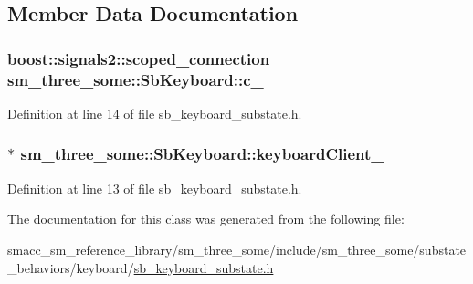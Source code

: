 \subsection{Member Data Documentation}
\subsubsection[{\texorpdfstring{c\+\_\+}{c_}}]{\setlength{\rightskip}{0pt plus 5cm}boost\+::signals2\+::scoped\+\_\+connection sm\+\_\+three\+\_\+some\+::\+Sb\+Keyboard\+::c\+\_\+}\hypertarget{classsm__three__some_1_1SbKeyboard_a3b384b219aad93ff23a9bcdb5cab5a80}{}\label{classsm__three__some_1_1SbKeyboard_a3b384b219aad93ff23a9bcdb5cab5a80}


Definition at line 14 of file sb\+\_\+keyboard\+\_\+substate.\+h.

\subsubsection[{\texorpdfstring{keyboard\+Client\+\_\+}{keyboardClient_}}]{$\ast$ sm\+\_\+three\+\_\+some\+::\+Sb\+Keyboard\+::keyboard\+Client\+\_\+}\hypertarget{classsm__three__some_1_1SbKeyboard_a9db2d2dd752cca859c1aa71c665991a8}{}\label{classsm__three__some_1_1SbKeyboard_a9db2d2dd752cca859c1aa71c665991a8}


Definition at line 13 of file sb\+\_\+keyboard\+\_\+substate.\+h.



The documentation for this class was generated from the following file\+:\begin{DoxyCompactItemize}
\item 
smacc\+\_\+sm\+\_\+reference\+\_\+library/sm\+\_\+three\+\_\+some/include/sm\+\_\+three\+\_\+some/substate\+\_\+behaviors/keyboard/\hyperlink{sb__keyboard__substate_8h}{sb\+\_\+keyboard\+\_\+substate.\+h}\end{DoxyCompactItemize}
